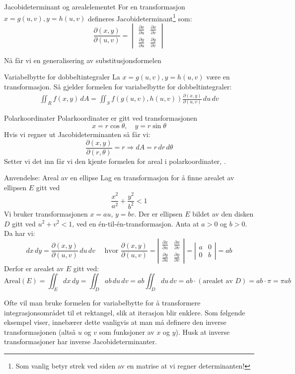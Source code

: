 \begin{defn}{Jacobideterminant og arealelementet}
For en transformasjon $x = g(u, v), y = h(u, v)$ defineres Jacobideterminant\footnote{Som vanlig betyr strek ved siden av en matrise at vi regner determinanten!} som:
\[
\frac{\partial(x, y)}{\partial(u, v)} = \begin{vmatrix} \frac{\partial x}{\partial u} & \frac{\partial x}{\partial v} \\ \frac{\partial y}{\partial u} & \frac{\partial y}{\partial v} \end{vmatrix}
\]
\end{defn}
Nå får vi en generalisering av substitusjonsformelen 
\begin{oppsum}{Variabelbytte for dobbeltintegraler}
La $x=g(u,v),y=h(u,v)$ være en transformasjon. Så gjelder formelen for variabelbytte for dobbeltintegraler:
\begin{align}\label{eq:variabelbytte}
\iint_R f(x, y)\, dA = \iint_S f(g(u, v), h(u, v))\frac{\partial(x, y)}{\partial(u, v)}\, du\, dv
\end{align}
\end{oppsum}

\begin{eks}{Polarkoordinater}
Polarkoordinater er gitt ved transformasjonen
\[
x = r\cos\theta, \quad y = r\sin\theta
\]
Hvis vi regner ut Jacobideterminanten så får vi:
\[
\frac{\partial(x, y)}{\partial(r, \theta)} = r \Rightarrow dA = r\, dr\, d\theta
\]
Setter vi det inn får vi den kjente formelen for areal i polarkoordinater, .
\end{eks}

\begin{eks}{Anvendelse: Areal av en ellipse}
Lag en transformasjon for å finne arealet av ellipsen \( E \) gitt ved
\[
\frac{x^2}{a^2} + \frac{y^2}{b^2} < 1
\]
Vi bruker transformasjonen \( x = au \), \( y = bv \). Der er ellipsen \( E \) bildet av den disken \( D \) gitt ved \( u^2 + v^2 < 1 \), ved en én-til-én-transformasjon. Anta at \( a > 0 \) og \( b > 0 \). Da har vi:
\[
dx\,dy = \frac{\partial(x,y)}{\partial(u,v)} \, du\,dv
\quad \text{ hvor } \frac{\partial(x,y)}{\partial(u,v)} =
\left|
\begin{array}{cc}
\frac{\partial x}{\partial u} & \frac{\partial x}{\partial v} \\
\frac{\partial y}{\partial u} & \frac{\partial y}{\partial v}
\end{array}
\right|
=
\left|
\begin{array}{cc}
a & 0 \\
0 & b
\end{array}
\right|
= ab
\]
Derfor er arealet av \( E \) gitt ved:
\[
\text{Areal}(E) = \iint_E dx\,dy = \iint_D ab\,du\,dv = ab \iint_D du\,dv = ab \cdot (\text{arealet av } D) = ab \cdot \pi = \pi ab
\]
\end{eks}
Ofte vil man bruke formelen for variabelbytte for å transformere integrasjonsområdet til et rektangel, slik at iterasjon blir enklere. Som følgende eksempel viser, innebærer dette vanligvis at man må definere den inverse transformasjonen (altså \( u \) og \( v \) som funksjoner av \( x \) og \( y \)). Husk at inverse transformasjoner har inverse Jacobideterminanter.

